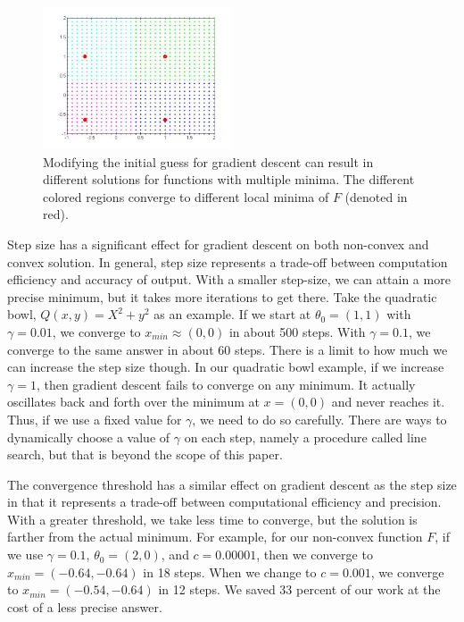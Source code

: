 \documentclass[10pt]{article}   %
\theoremstyle{plain}
\begin{document}
\begin{figure}[h!]\label{initial_guesses}
  \caption{Modifying the initial guess for gradient descent can result in different solutions for functions with multiple minima. The different colored regions converge to different local minima of $F$ (denoted in red). }
  \centering
    \includegraphics[width=0.5\textwidth]{figures/1_2_start_guesses.jpg}
\end{figure}

Step size has a significant effect for gradient descent on both non-convex and convex solution. In general, step size represents a trade-off between computation efficiency and accuracy of output. With a smaller step-size, we can attain a more precise minimum, but it takes more iterations to get there. Take the quadratic bowl, $Q(x,y) = X^2 + y^2$ as an example. If we start at $\theta_0 = (1,1)$ with $\gamma = 0.01$, we converge to $x_{min} \approx (0,0)$ in about 500 steps. With $\gamma = 0.1$, we converge to the same answer in about 60 steps. There is a limit to how much we can increase the step size though. In our quadratic bowl example, if we increase $\gamma = 1$, then gradient descent fails to converge on any minimum. It actually oscillates back and forth over the minimum at $x = (0,0)$ and never reaches it. Thus, if we use a fixed value for $\gamma$, we need to do so carefully. There are ways to dynamically choose a value of $\gamma$ on each step, namely a procedure called line search, but that is beyond the scope of this paper.

The convergence threshold has a similar effect on gradient descent as the step size in that it represents a trade-off between computational efficiency and precision. With a greater threshold, we take less time to converge, but the solution is farther from the actual minimum. For example, for our non-convex function $F$, if we use $\gamma = 0.1$,  $\theta_0 = (2,0)$, and $c = 0.00001$, then we converge to $x_{min} = (-0.64,-0.64)$ in 18 steps. When we change to $c = 0.001$, we converge to $x_{min} = (-0.54,-0.64)$ in 12 steps. We saved 33 percent of our work at the cost of a less precise answer.
\end{document}
